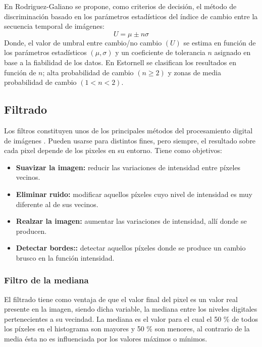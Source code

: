
En Rodriguez-Galiano \cite{rodriguez2010analisis} se propone, como criterios de decisi\'on, el m\'etodo de discriminaci\'on basado en los par\'ametros estad\'isticos del \'indice de cambio entre la secuencia temporal de im\'agenes:
\begin{equation}
U=\mu \pm n\sigma
\end{equation}
Donde, el valor de umbral entre cambio/no cambio $ (U) $ se estima en funci\'on de los par\'ametros estad\'isticos $ (\mu, \sigma) $ y un coeficiente de tolerancia $ n $ asignado en base a la fiabilidad de los datos. En Estornell \cite{estornell2004analisis} se clasifican los resultados en funci\'on de $ n $; alta probabilidad de cambio $ (n \geq 2) $ y
zonas de media probabilidad de cambio $ (1 < n < 2) $.

\subsection{Filtrado}
Los filtros constituyen unos de los principales m\'etodos del procesamiento digital de im\'agenes . Pueden usarse para distintos fines, pero siempre, el resultado sobre cada pixel depende de los pixeles en su entorno. Tiene como objetivos: 
	\begin{itemize}
		\item \textbf{Suavizar la imagen:} reducir las variaciones de intensidad entre p\'ixeles vecinos.
		\item \textbf{Eliminar ruido:}  modificar aquellos p\'ixeles cuyo nivel de intensidad es muy diferente al de sus vecinos.
		\item \textbf{Realzar la imagen:} aumentar las variaciones de intensidad, all\'i donde se producen.
		\item \textbf{Detectar bordes::} detectar aquellos p\'ixeles donde se produce un cambio brusco en la funci\'on intensidad.	
	\end{itemize}
\subsubsection{Filtro de la mediana}\label{subsec:filMediana}
El filtrado tiene como ventaja de que el valor final del pixel es un valor real presente en la imagen, siendo dicha variable, la mediana entre los niveles digitales pertenecientes a su vecindad. La mediana es el valor para el cual el 50 \% de todos los p\'ixeles en el histograma son mayores y 50 \% son menores, al contrario de la media \'esta no es influenciada por los valores m\'aximos o m\'inimos\cite{mehl1997fundamentos}.

